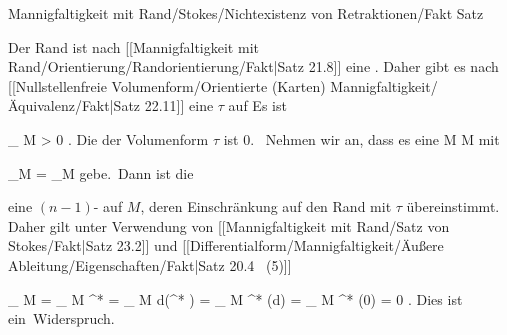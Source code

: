 {Mannigfaltigkeit mit Rand/Stokes/Nichtexistenz von Retraktionen/Fakt}
{Satz}
{}
{

\faktzusatz {}
\faktzusatz {}

}
{

Der Rand
 ist nach
[[Mannigfaltigkeit mit Rand/Orientierung/Randorientierung/Fakt|Satz 21.8]]
eine
 {} {.}
Daher gibt es nach
[[Nullstellenfreie Volumenform/Orientierte (Karten) Mannigfaltigkeit/Äquivalenz/Fakt|Satz 22.11]]
eine
$\tau$ auf
 Es ist

\mavergleichskette
{\vergleichskette
{
\int_{  \partial M  }  \tau
}
{ > }{ 0
}
{  }{
}
{    }{
}
{   }{
}
}
{}{}{.}
Die
der Volumenform $\tau$ ist $0$.
 Nehmen wir an, dass es eine
\maabbdisp {\varphi} { M } { \partial M
} {}
mit

\mavergleichskette
{\vergleichskette
{ \varphi \vert_{\partial M}
}
{ = }{ _{\partial M}
}
{  }{
}
{    }{
}
{   }{
}
}
{}{}{}
gebe. Dann ist die

\mathl{\varphi^* \tau}{} eine
$(n-1)$-
auf $M$, deren Einschränkung auf den Rand mit $\tau$ übereinstimmt. Daher gilt unter Verwendung von
[[Mannigfaltigkeit mit Rand/Satz von Stokes/Fakt|Satz 23.2]]
und
[[Differentialform/Mannigfaltigkeit/Äußere Ableitung/Eigenschaften/Fakt|Satz 20.4  (5)]]

\mavergleichskettealign
{\vergleichskettealign
{
\int_{  \partial M  }   \tau
}
{ =} {
\int_{  \partial  M  }   \varphi^* \tau
}
{ =} {
\int_{  M  }   d(\varphi^* \tau)
}
{ =} {
\int_{  M  }   \varphi^* (d\tau)
}
{ =} {
\int_{  M  }   \varphi^* (0)
}
}
{
\vergleichskettefortsetzungalign
{ =} { 0
}
{ } {}
{ } {}
{ } {}
}
{}{.}
Dies ist ein Widerspruch.

}

